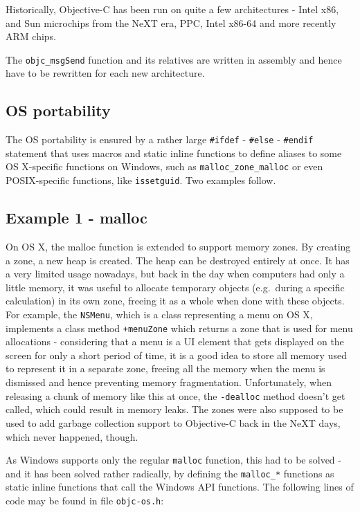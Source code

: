 Historically, Objective-C has been run on quite a few architectures - Intel x86, and Sun microchips from the NeXT era, PPC, Intel x86-64 and more recently ARM chips.

The \verb=objc_msgSend= function and its relatives are written in assembly and hence have to be rewritten for each new architecture.

\subsection{OS portability}

The OS portability is ensured by a rather large \verb=#ifdef= - \verb=#else= - \verb=#endif= statement that uses macros and static inline functions to define aliases to some OS X-specific functions on Windows, such as \verb=malloc_zone_malloc= or even POSIX-specific functions, like \verb=issetguid=. Two examples follow.

\subsection{Example 1 - malloc}
On OS X, the malloc function is extended to support memory zones\cite{apple_malloc_man_page}. By creating a zone, a new heap is created. The heap can be destroyed entirely at once. It has a very limited usage nowadays, but back in the day when computers had only a little memory, it was useful to allocate temporary objects (e.g.\ during a specific calculation) in its own zone, freeing it as a whole when done with these objects. For example, the \verb=NSMenu=, which is a class representing a menu on OS X, implements a class method \verb=+menuZone= which returns a zone that is used for menu allocations - considering that a menu is a UI element that gets displayed on the screen for only a short period of time, it is a good idea to store all memory used to represent it in a separate zone, freeing all the memory when the menu is dismissed and hence preventing memory fragmentation. Unfortunately, when releasing a chunk of memory like this at once, the \verb=-dealloc= method doesn't get called, which could result in memory leaks. The zones were also supposed to be used to add garbage collection support to Objective-C back in the NeXT days, which never happened, though.

As Windows supports only the regular \verb=malloc= function, this had to be solved - and it has been solved rather radically, by defining the \verb=malloc_*= functions as static inline functions that call the Windows API functions. The following lines of code may be found in file \verb=objc-os.h=:


